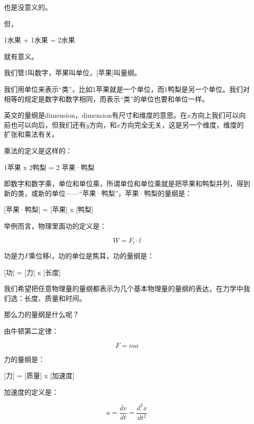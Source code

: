 也是没意义的。

但，

\begin{center}
1水果 + 1水果 = 2水果
\end{center}

就有意义。

我们管1叫数字，苹果叫单位，[苹果]叫量纲。

我们用单位来表示“类”，比如1苹果就是一个单位，而1鸭梨是另一个单位。我们对相等的规定是数字和数字相同，而表示“类”的单位也要和单位一样。

英文的量纲是dimension，dimension有尺寸和维度的意思。在$x$方向上我们可以向前也可以向后，但我们还有$y$方向，和$x$方向完全无关，这是另一个维度，维度的扩张和乘法有关。

乘法的定义是这样的：

\begin{center}
1苹果 x 2鸭梨 = 2 苹果·鸭梨
\end{center}

即数字和数字乘，单位和单位乘，所谓单位和单位乘就是把苹果和鸭梨并列，得到新的类，或新的单位——“苹果·鸭梨”，苹果·鸭梨的量纲是：

\begin{center}
[苹果·鸭梨] = [苹果] x [鸭梨]
\end{center}

举例而言，物理里面功的定义是：

\begin{equation}
W = F_l \cdot l
\end{equation}

功是力$F$乘位移$l$，功的单位是焦耳，功的量纲是：

\begin{center}
[功] = [力] x [长度]
\end{center}

我们希望把任意物理量的量纲都表示为几个基本物理量的量纲的表达，在力学中我们选：长度、质量和时间。

那么力的量纲是什么呢？

由牛顿第二定律：

\begin{equation}
F = m a
\end{equation}

力的量纲是：

\begin{center}
[力] = [质量] x [加速度]
\end{center}

加速度的定义是：

\begin{equation}
a = \frac{d v}{d t} = \frac{d^2 x}{dt^2}
\end{equation}

